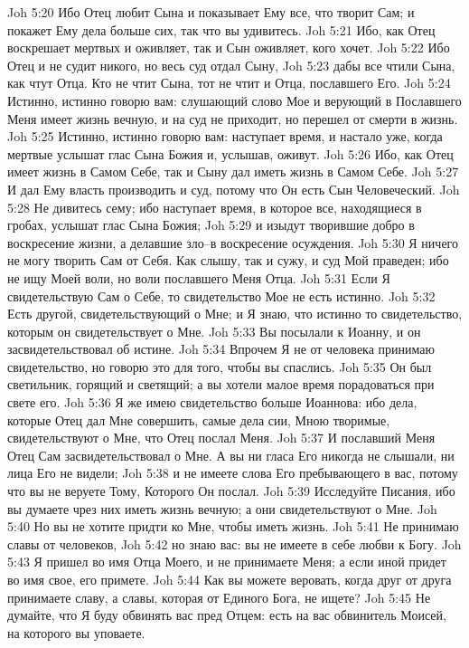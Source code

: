 Joh 5:20  Ибо Отец любит Сына и показывает Ему все, что творит Сам; и покажет Ему дела больше сих, так что вы удивитесь.
Joh 5:21  Ибо, как Отец воскрешает мертвых и оживляет, так и Сын оживляет, кого хочет.
Joh 5:22  Ибо Отец и не судит никого, но весь суд отдал Сыну,
Joh 5:23  дабы все чтили Сына, как чтут Отца. Кто не чтит Сына, тот не чтит и Отца, пославшего Его.
Joh 5:24  Истинно, истинно говорю вам: слушающий слово Мое и верующий в Пославшего Меня имеет жизнь вечную, и на суд не приходит, но перешел от смерти в жизнь.
Joh 5:25  Истинно, истинно говорю вам: наступает время, и настало уже, когда мертвые услышат глас Сына Божия и, услышав, оживут.
Joh 5:26  Ибо, как Отец имеет жизнь в Самом Себе, так и Сыну дал иметь жизнь в Самом Себе.
Joh 5:27  И дал Ему власть производить и суд, потому что Он есть Сын Человеческий.
Joh 5:28  Не дивитесь сему; ибо наступает время, в которое все, находящиеся в гробах, услышат глас Сына Божия;
Joh 5:29  и изыдут творившие добро в воскресение жизни, а делавшие зло--в воскресение осуждения.
Joh 5:30  Я ничего не могу творить Сам от Себя. Как слышу, так и сужу, и суд Мой праведен; ибо не ищу Моей воли, но воли пославшего Меня Отца.
Joh 5:31  Если Я свидетельствую Сам о Себе, то свидетельство Мое не есть истинно.
Joh 5:32  Есть другой, свидетельствующий о Мне; и Я знаю, что истинно то свидетельство, которым он свидетельствует о Мне.
Joh 5:33  Вы посылали к Иоанну, и он засвидетельствовал об истине.
Joh 5:34  Впрочем Я не от человека принимаю свидетельство, но говорю это для того, чтобы вы спаслись.
Joh 5:35  Он был светильник, горящий и светящий; а вы хотели малое время порадоваться при свете его.
Joh 5:36  Я же имею свидетельство больше Иоаннова: ибо дела, которые Отец дал Мне совершить, самые дела сии, Мною творимые, свидетельствуют о Мне, что Отец послал Меня.
Joh 5:37  И пославший Меня Отец Сам засвидетельствовал о Мне. А вы ни гласа Его никогда не слышали, ни лица Его не видели;
Joh 5:38  и не имеете слова Его пребывающего в вас, потому что вы не веруете Тому, Которого Он послал.
Joh 5:39  Исследуйте Писания, ибо вы думаете чрез них иметь жизнь вечную; а они свидетельствуют о Мне.
Joh 5:40  Но вы не хотите придти ко Мне, чтобы иметь жизнь.
Joh 5:41  Не принимаю славы от человеков,
Joh 5:42  но знаю вас: вы не имеете в себе любви к Богу.
Joh 5:43  Я пришел во имя Отца Моего, и не принимаете Меня; а если иной придет во имя свое, его примете.
Joh 5:44  Как вы можете веровать, когда друг от друга принимаете славу, а славы, которая от Единого Бога, не ищете?
Joh 5:45  Не думайте, что Я буду обвинять вас пред Отцем: есть на вас обвинитель Моисей, на которого вы уповаете.
